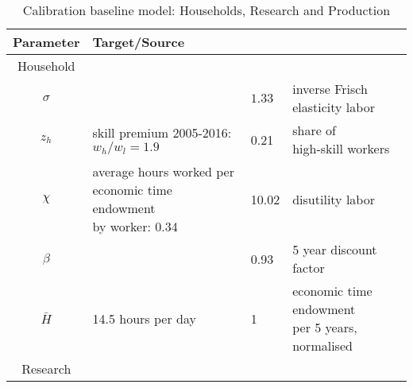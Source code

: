  \begin{table}[h!]
 	\begin{center}
 		\captionsetup{width=0.9\textwidth}
 		\caption{ Calibration baseline model: Households, Research and Production}
 		\label{tab:calib}
 		\begin{tabular}{c|lll}
 			\hline \hline
 			Parameter& Target/Source& \makecell[l]{Calibration}& \makecell[l]{Meaning}\\ 
 			\hline
 			\hline
 			Household&\multicolumn{3}{c}{}\\
 			\hline 
 			
 			\hline
 			$\sigma$ &  \makecell[l]{\cite{Chetty2011AreMargins}}& $1.33$ & inverse Frisch elasticity labor  \\
 			\hline
 			$z_h$& \makecell[l]{skill premium 2005-2016:\\ $w_h/w_l=1.9$\\ \citep{Slavik2020WagePremium}}&0.21&\makecell[l]{share of\\ high-skill workers} \\	
 			\hline			
 			$\chi$ &  \makecell[l]{average hours worked per\\ economic time endowment\\ by worker: 0.34 \cite{OECDHoursworked}}& 10.02 & disutility labor \\
 			\hline
 			$\beta$ &  \makecell[l]{\cite{Barrage2019OptimalPolicy}}& 0.93 & 5 year discount factor  \\
 			\hline
 			$\bar{H}$& \makecell[l]{14.5 hours per day\\ \cite{Jones1993OptimalGrowth}}&1&\makecell[l]{economic time endowment \\per 5 years, normalised} \\
 			\hline
 			\hline
 			Research&\multicolumn{3}{c}{}\\
 			\hline
 			

\end{tabular}
\end{center}
\end{table}
